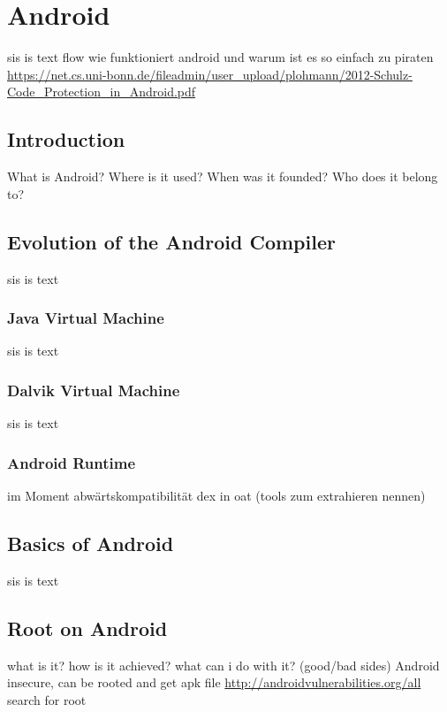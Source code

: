 \section{Android}\label{section:android}
sis is text\newline
flow wie funktioniert android und warum ist es so einfach zu piraten\newline
\url{https://net.cs.uni-bonn.de/fileadmin/user_upload/plohmann/2012-Schulz-Code_Protection_in_Android.pdf}\newline
\subsection{Introduction}\label{subsection:android-history}
What is Android? Where is it used? When was it founded? Who does it belong to?
\subsection{Evolution of the Android Compiler}\label{subsection:android-evolution}
sis is text
\subsubsection{Java Virtual Machine}\label{subsubsection:android-evolution-jvm}
sis is text
\subsubsection{Dalvik Virtual Machine}\label{subsubsection:android-evolution-dvm}
sis is text
\subsubsection{Android Runtime}\label{subsubsection:android-evolution-art}
im Moment abwärtskompatibilität dex in oat (tools zum extrahieren nennen)
\subsection{Basics of Android}\label{subsection:android-basics}
sis is text
\subsection{Root on Android}\label{subsection:android-root}
what is it? how is it achieved? what can i do with it? (good/bad sides)\newline
Android insecure, can be rooted and get apk file \url{http://androidvulnerabilities.org/all} search for root\newline
